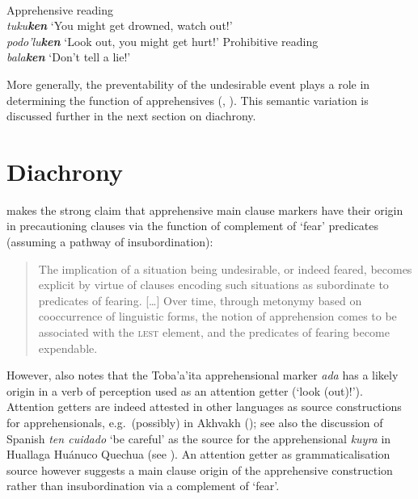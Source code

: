 \documentclass[output=paper,colorlinks,citecolor=brown
]{langscibook}
\begin{document}
\ea \label{ex:intro23} 
\\
\ea \label{ex:intro23a} \textnormal{Apprehensive reading} \\
\textit{tuku\textbf{ken}}  \textnormal{`You might get drowned, watch out!'}\\
\textit{podo'lu\textbf{ken}}  \textnormal{`Look out, you might get hurt!'}
\ex \label{ex:intro23b} \textnormal{Prohibitive reading}\\
\textit{bala\textbf{ken}} \textnormal{`Don't tell a lie!'}
\z
\z


\noindent More generally, the preventability of the undesirable event plays a role in determining the function of apprehensives (\citealt{chapters/fedotov}, \citealt{chapters/vuillermet}). This semantic variation is discussed further in the next section on diachrony.



\section{Diachrony}
\label{sec:diachrony}

\citet{lichtenberk1995} makes the strong claim that apprehensive main clause markers have their origin in precautioning clauses via the function of complement of `fear' predicates (assuming a pathway of insubordination):

\begin{quote}
    The implication of a situation being undesirable, or indeed feared, becomes explicit by virtue of clauses encoding such situations as subordinate to predicates of fearing. [\ldots] Over time, through metonymy based on cooccurrence of linguistic forms, the notion of apprehension comes to be associated with the \textsc{lest} element, and the predicates of fearing become expendable. \citep[319]{lichtenberk1995}
\end{quote}

 However, \citet[303]{lichtenberk1995} also notes that the Toba'a'ita apprehensional marker \textit{ada} has a likely origin in a verb of perception used as an attention getter (`look (out)!'). Attention getters are indeed attested in other languages as source constructions for apprehensionals, e.g.\ (possibly) in Akhvakh (\citealt{chapters/daniel}); see also the discussion of Spanish \textit{ten cuidado} `be careful' as the source for the apprehensional \textit{kuyra} in Huallaga Huánuco Quechua (see ). An attention getter as grammaticalisation source however suggests a main clause origin of the apprehensive construction rather than insubordination via a complement of `fear'. 
\end{document}
